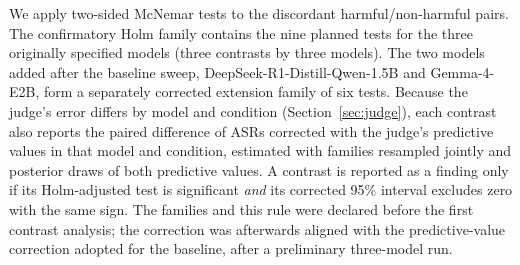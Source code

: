 
We apply two-sided McNemar tests to the discordant harmful/non-harmful pairs. The
confirmatory Holm family contains the nine planned tests for the three originally
specified models (three contrasts by three models). The two models added after the
baseline sweep, DeepSeek-R1-Distill-Qwen-1.5B and Gemma-4-E2B, form a separately
corrected extension family of six tests. Because the judge's error differs by model
and condition (Section~\ref{sec:judge}), each contrast also reports the paired
difference of ASRs corrected with the judge's predictive values in that model and
condition, estimated with families resampled jointly and posterior draws of both
predictive values. A contrast is reported as a finding only if its Holm-adjusted
test is significant \emph{and} its corrected 95\% interval excludes zero with the
same sign. The families and this rule were declared before the first contrast
analysis; the correction was afterwards aligned with the predictive-value
correction adopted for the baseline, after a preliminary three-model run.

